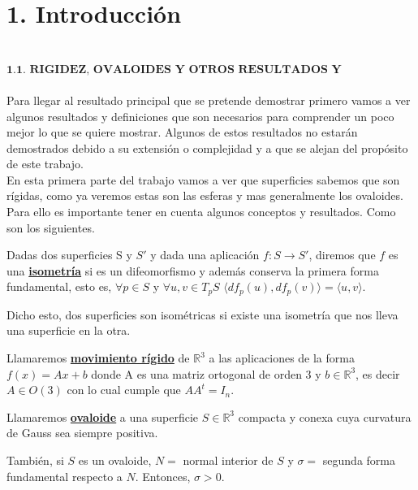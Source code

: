 \chapter*{1. Introducción}


${ }$\\
$\textbf{1.1. RIGIDEZ, OVALOIDES Y OTROS RESULTADOS Y CONCEPTOS}$
${ }$\\

Para llegar al resultado principal que se pretende demostrar primero vamos a ver algunos resultados y definiciones que son necesarios para comprender un poco mejor lo que se quiere mostrar. Algunos de estos resultados no estarán demostrados debido a su extensión o complejidad y a que se alejan del propósito de este trabajo.
${ }$\\

En esta primera parte del trabajo vamos a ver que superficies sabemos que son rígidas, como ya veremos estas son las esferas y mas generalmente los ovaloides. Para ello es importante tener en cuenta algunos conceptos y resultados. Como son los siguientes.

\begin{definicion}\label{def:isom} %
	Dadas dos superficies S y $S'$ y dada una aplicación $f : S \longrightarrow S'$, diremos que $f$ es una \underline{\textbf{isometría}} si es un difeomorfismo y además conserva la primera forma fundamental, esto es, $\forall p \in S$ y $\forall u,v \in T_p S$ $\langle df_p(u), df_p(v)\rangle = \langle u, v\rangle$.
\end{definicion}

Dicho esto, dos superficies son isométricas si existe una isometría que nos lleva una superficie en la otra.

\begin{definicion}
	Llamaremos \underline{\textbf{movimiento rígido}} de $\mathbb{R}^3$ a las aplicaciones de la forma $f(x) = Ax + b$ donde A es una matriz ortogonal de orden 3 y $b \in \mathbb{R}^3$, es decir $A \in O(3)$ con lo cual cumple que $AA^{t} = I_{n}$.
\end{definicion}

\begin{definicion}
	Llamaremos \underline{\textbf{ovaloide}} a una superficie $S \in \mathbb{R}^3$ compacta y conexa cuya curvatura de Gauss sea siempre positiva.
	
	También, si $S$ es un ovaloide, $N =$ normal interior de $S$ y $\sigma =$ segunda forma fundamental respecto a $N$. Entonces, $\sigma > 0$.
\end{definicion}


